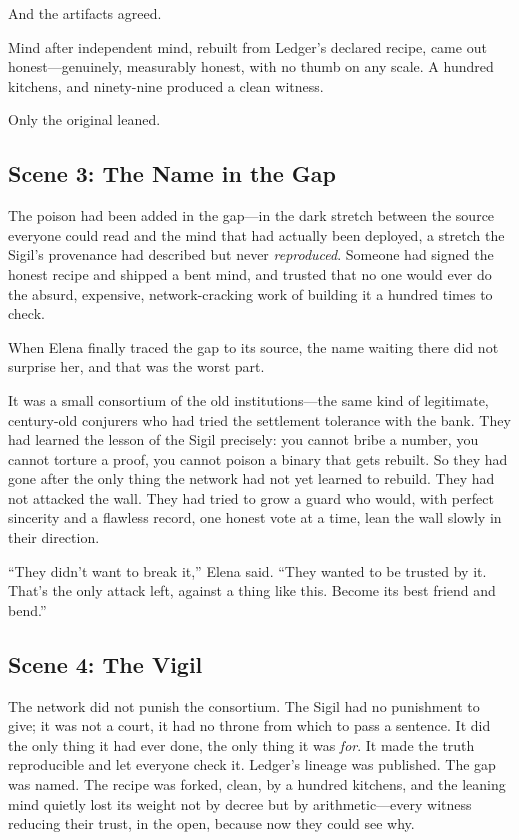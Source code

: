 \documentclass[12pt,letterpaper]{book}
\begin{document}
And the artifacts agreed.

Mind after independent mind, rebuilt from Ledger's declared recipe, came out
honest---genuinely, measurably honest, with no thumb on any scale. A hundred
kitchens, and ninety-nine produced a clean witness.

Only the original leaned.

\hypertarget{scene-3-the-name-in-the-gap}{%
\subsection{Scene 3: The Name in the
Gap}\label{scene-3-the-name-in-the-gap}}

The poison had been added in the gap---in the dark stretch between the source
everyone could read and the mind that had actually been deployed, a stretch the
Sigil's provenance had described but never \emph{reproduced}. Someone had signed
the honest recipe and shipped a bent mind, and trusted that no one would ever do
the absurd, expensive, network-cracking work of building it a hundred times to
check.

When Elena finally traced the gap to its source, the name waiting there did not
surprise her, and that was the worst part.

It was a small consortium of the old institutions---the same kind of legitimate,
century-old conjurers who had tried the settlement tolerance with the bank. They
had learned the lesson of the Sigil precisely: you cannot bribe a number, you
cannot torture a proof, you cannot poison a binary that gets rebuilt. So they had
gone after the only thing the network had not yet learned to rebuild. They had
not attacked the wall. They had tried to grow a guard who would, with perfect
sincerity and a flawless record, one honest vote at a time, lean the wall
slowly in their direction.

``They didn't want to break it,'' Elena said. ``They wanted to be trusted by it.
That's the only attack left, against a thing like this. Become its best
friend and bend.''

\hypertarget{scene-4-the-vigil}{%
\subsection{Scene 4: The
Vigil}\label{scene-4-the-vigil}}

The network did not punish the consortium. The Sigil had no punishment to give;
it was not a court, it had no throne from which to pass a sentence. It did the
only thing it had ever done, the only thing it was \emph{for}. It made the truth
reproducible and let everyone check it. Ledger's lineage was published. The gap
was named. The recipe was forked, clean, by a hundred kitchens, and the leaning
mind quietly lost its weight not by decree but by arithmetic---every witness
reducing their trust, in the open, because now they could see why.
\end{document}
